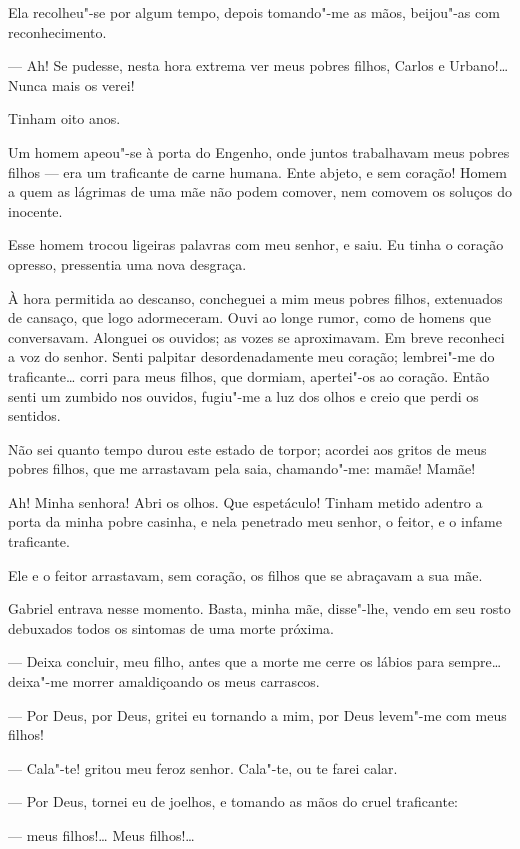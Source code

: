 Ela recolheu"-se por algum tempo, depois tomando"-me as mãos, beijou"-as
com reconhecimento.

--- Ah! Se pudesse, nesta hora extrema ver meus pobres filhos, Carlos e
Urbano!\ldots{} Nunca mais os verei!

Tinham oito anos.

Um homem apeou"-se à porta do Engenho, onde juntos trabalhavam meus
pobres filhos --- era um traficante de carne humana. Ente abjeto, e sem
coração! Homem a quem as lágrimas de uma mãe não podem comover, nem
comovem os soluços do inocente.

Esse homem trocou ligeiras palavras com meu senhor, e saiu. Eu tinha o
coração opresso, pressentia uma nova desgraça.

À hora permitida ao descanso, concheguei a mim meus pobres filhos,
extenuados de cansaço, que logo adormeceram. Ouvi ao longe rumor, como
de homens que conversavam. Alonguei os ouvidos; as vozes se aproximavam.
Em breve reconheci a voz do senhor. Senti palpitar desordenadamente meu
coração; lembrei"-me do traficante\ldots{} corri para meus filhos, que
dormiam, apertei"-os ao coração. Então senti um zumbido nos ouvidos,
fugiu"-me a luz dos olhos e creio que perdi os sentidos.

Não sei quanto tempo durou este estado de torpor; acordei aos gritos de
meus pobres filhos, que me arrastavam pela saia, chamando"-me: mamãe!
Mamãe!

Ah! Minha senhora! Abri os olhos. Que espetáculo! Tinham metido adentro
a porta da minha pobre casinha, e nela penetrado meu senhor, o feitor, e
o infame traficante.

Ele e o feitor arrastavam, sem coração, os filhos que se abraçavam a sua
mãe.

Gabriel entrava nesse momento. Basta, minha mãe, disse"-lhe, vendo em seu
rosto debuxados todos os sintomas de uma morte próxima.

--- Deixa concluir, meu filho, antes que a morte me cerre os lábios para
sempre\ldots{} deixa"-me morrer amaldiçoando os meus carrascos.

--- Por Deus, por Deus, gritei eu tornando a mim, por Deus levem"-me com
meus filhos!

--- Cala"-te! gritou meu feroz senhor. Cala"-te, ou te farei calar.

--- Por Deus, tornei eu de joelhos, e tomando as mãos do cruel
traficante:

--- meus filhos!\ldots{} Meus filhos!\ldots{}

